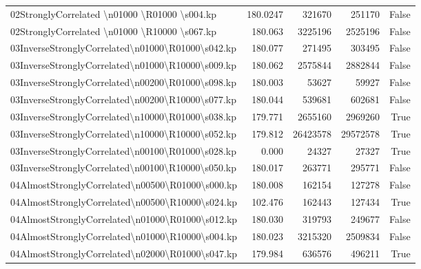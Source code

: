 \documentclass[english, a4paper,12pt]{article}
\begin{document}
\begin{tabularx}{0.97\textwidth}{|>{\raggedright\arraybackslash}Xrrrr|}
02StronglyCorrelated \textbackslash n01000 \textbackslash R01000 \textbackslash s004.kp & 180.0247 & 321670 & 251170 & False \\
02StronglyCorrelated \textbackslash n01000 \textbackslash R10000 \textbackslash s067.kp & 180.063 & 3225196 & 2525196 & False \\
\hline
\addlinespace
\hline
03InverseStronglyCorrelated\textbackslash n01000\textbackslash R01000\textbackslash s042.kp & 180.077 & 271495 & 303495 & False \\
03InverseStronglyCorrelated\textbackslash n01000\textbackslash R10000\textbackslash s009.kp & 180.062 & 2575844 & 2882844 & False \\
03InverseStronglyCorrelated\textbackslash n00200\textbackslash R01000\textbackslash s098.kp & 180.003 & 53627 & 59927 & False \\
03InverseStronglyCorrelated\textbackslash n00200\textbackslash R10000\textbackslash s077.kp & 180.044 & 539681 & 602681 & False \\
03InverseStronglyCorrelated\textbackslash n10000\textbackslash R01000\textbackslash s038.kp & 179.771 & 2655160 & 2969260 & True \\
03InverseStronglyCorrelated\textbackslash n10000\textbackslash R10000\textbackslash s052.kp & 179.812 & 26423578 & 29572578 & True \\
03InverseStronglyCorrelated\textbackslash n00100\textbackslash R01000\textbackslash s028.kp & 0.000 & 24327 & 27327 & True \\
03InverseStronglyCorrelated\textbackslash n00100\textbackslash R10000\textbackslash s050.kp & 180.017 & 263771 & 295771 & False \\
\hline
\addlinespace
\hline
04AlmostStronglyCorrelated\textbackslash n00500\textbackslash R01000\textbackslash s000.kp & 180.008 & 162154 & 127278 & False \\
04AlmostStronglyCorrelated\textbackslash n00500\textbackslash R10000\textbackslash s024.kp & 102.476 & 162443 & 127434 & True \\
04AlmostStronglyCorrelated\textbackslash n01000\textbackslash R01000\textbackslash s012.kp & 180.030 & 319793 & 249677 & False \\
04AlmostStronglyCorrelated\textbackslash n01000\textbackslash R10000\textbackslash s004.kp & 180.023 & 3215320 & 2509834 & False \\
04AlmostStronglyCorrelated\textbackslash n02000\textbackslash R01000\textbackslash s047.kp & 179.984 & 636576 & 496211 & True \\

\end{tabularx}
\end{document}
